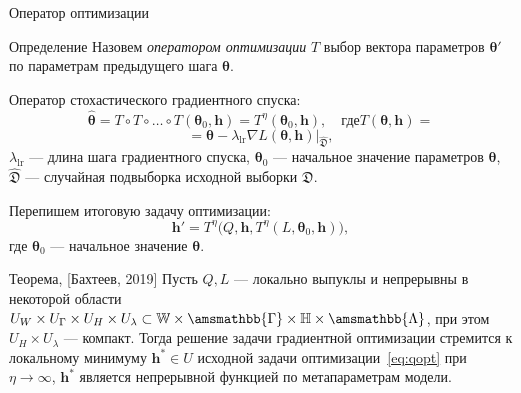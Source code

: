 \documentclass[usenames,dvipsnames,11pt,pdf,utf8,russian,aspectratio=43]{beamer}
\begin{document}
\begin{frame}{Оператор оптимизации}
\footnotesize
\begin{block}{Определение}
Назовем \textit{оператором оптимизации}  $T$ выбор вектора параметров $\boldsymbol{\theta}'$  по параметрам предыдущего шага $\boldsymbol{\theta}$.
\end{block}
Оператор стохастического градиентного спуска:
\[
	 \hat{\boldsymbol{\theta}} = T \circ T \circ \dots \circ T(\boldsymbol{\theta}_0, \mathbf{h}) = T^\eta(\boldsymbol{\theta}_0, \mathbf{h}), \quad\text{где}	T(\boldsymbol{\theta}, \mathbf{h}) =
\]
\[=\boldsymbol{\theta} - \lambda_\text{lr} \nabla L(\boldsymbol{\theta}, \mathbf{h})|_{\hat{\mathfrak{D}}}, 
\]
$\lambda_{\text{lr}}$ --- длина шага градиентного спуска, $\boldsymbol{\theta}_0$ --- начальное значение параметров $\boldsymbol{\theta}$, $\hat{\mathfrak{D}}$ --- случайная подвыборка исходной выборки $\mathfrak{D}$.


Перепишем итоговую задачу оптимизации:
\[
	 \mathbf{h}' = T^\eta\bigl(Q, \mathbf{h}, T^\eta(L, \boldsymbol{\theta}_0, \mathbf{h})\bigr),
\]
где $\boldsymbol{\theta}_0$ --- начальное значение $\boldsymbol{\theta}$.

\begin{block}{Теорема, [Бахтеев, 2019]}
Пусть $Q,L$ --- локально выпуклы и непрерывны в некоторой области $U_{W} \times U_{\Gamma} \times U_H \times U_\lambda \subset \mathbb{W}\times\amsmathbb{\Gamma}\times\mathbb{H}\times\amsmathbb{\Lambda}$, при  этом $U_H \times U_\lambda$ --- компакт. 
Тогда решение задачи градиентной оптимизации стремится к локальному минимуму  $\mathbf{h}^{*} \in U$ исходной задачи оптимизации~\eqref{eq:qopt} при $\eta \to \infty$,
$\mathbf{h}^{*}$ является непрерывной функцией по метапараметрам модели.
\end{block}

\end{frame}
\end{document}
